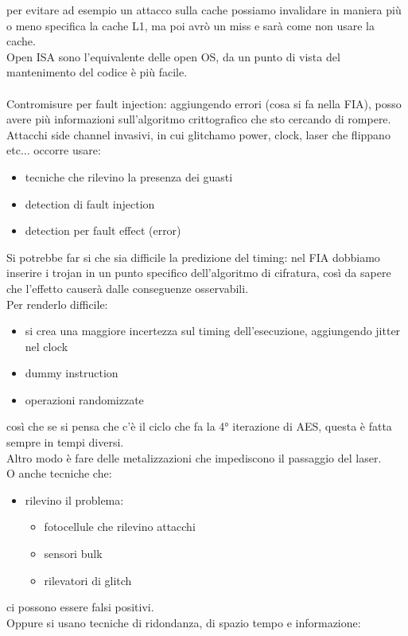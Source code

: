 \documentclass[oneside, 12pt]{extbook}
\begin{document}
per evitare ad esempio un attacco sulla cache possiamo invalidare in maniera più o meno specifica la cache L1, ma poi avrò un miss e sarà come non usare la cache.
\\Open ISA sono l'equivalente delle open OS, da un punto di vista del mantenimento del codice è più facile.
\\\\Contromisure per fault injection: aggiungendo errori (cosa si fa nella FIA), posso avere più informazioni sull'algoritmo crittografico che sto cercando di rompere.
\\Attacchi side channel invasivi, in cui glitchamo power, clock, laser che flippano etc... occorre usare:
\begin{itemize}
	\item tecniche che rilevino la presenza dei guasti
	\item detection di fault injection
	\item detection per fault effect (error)
\end{itemize}
Si potrebbe far si che sia difficile la predizione del timing: nel FIA dobbiamo inserire i trojan in un punto specifico dell'algoritmo di cifratura, così da sapere che l'effetto causerà dalle conseguenze osservabili.
\\Per renderlo difficile:
\begin{itemize}
	\item si crea una maggiore incertezza sul timing dell'esecuzione, aggiungendo jitter nel clock
	\item dummy instruction
	\item operazioni randomizzate
\end{itemize}
così che se si pensa che c'è il ciclo che fa la 4° iterazione di AES, questa è fatta sempre in tempi diversi.
\\Altro modo è fare delle metalizzazioni che impediscono il passaggio del laser.
\\O anche tecniche che:
\begin{itemize}
	\item rilevino il problema:
	\begin{itemize}
		\item fotocellule che rilevino attacchi
		\item sensori bulk
		\item rilevatori di glitch
	\end{itemize} 
\end{itemize}
ci possono essere falsi positivi.
\\Oppure si usano tecniche di ridondanza, di spazio tempo e informazione:
\end{document}
